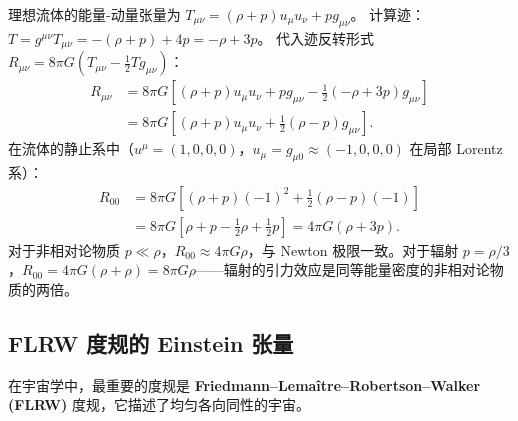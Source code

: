 \begin{example}[理想流体的迹反转方程]
理想流体的能量-动量张量为 $T_{\mu\nu} = (\rho + p)u_\mu u_\nu + p g_{\mu\nu}$。
计算迹：$T = g^{\mu\nu}T_{\mu\nu} = -(\rho + p) + 4p = -\rho + 3p$。
代入迹反转形式 $R_{\mu\nu} = 8\pi G(T_{\mu\nu} - \frac{1}{2}T g_{\mu\nu})$：
\begin{align}
    R_{\mu\nu} &= 8\pi G\left[ (\rho + p)u_\mu u_\nu + p g_{\mu\nu} - \frac{1}{2}(-\rho + 3p)g_{\mu\nu} \right] \\
    &= 8\pi G\left[ (\rho + p)u_\mu u_\nu + \frac{1}{2}(\rho - p)g_{\mu\nu} \right].
\end{align}
在流体的静止系中（$u^\mu = (1, 0, 0, 0)$，$u_\mu = g_{\mu 0} \approx (-1, 0, 0, 0)$ 在局部 Lorentz 系）：
\begin{align}
    R_{00} &= 8\pi G\left[ (\rho + p)(-1)^2 + \frac{1}{2}(\rho - p)(-1) \right] \\
           &= 8\pi G\left[ \rho + p - \frac{1}{2}\rho + \frac{1}{2}p \right]
           = 4\pi G(\rho + 3p).
\end{align}
对于非相对论物质 $p \ll \rho$，$R_{00} \approx 4\pi G\rho$，与 Newton 极限一致。对于辐射 $p = \rho/3$，$R_{00} = 4\pi G(\rho + \rho) = 8\pi G\rho$——辐射的引力效应是同等能量密度的非相对论物质的两倍。
\end{example}

\subsection{FLRW 度规的 Einstein 张量}

在宇宙学中，最重要的度规是 \textbf{Friedmann--Lemaître--Robertson--Walker (FLRW)} 度规，它描述了均匀各向同性的宇宙。

